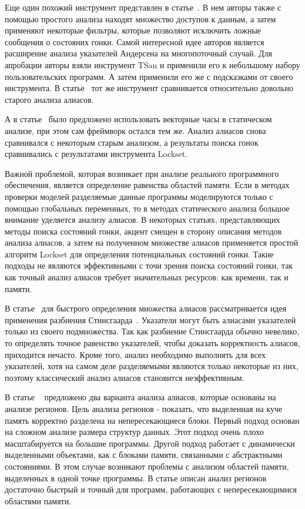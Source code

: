 Еще один похожий инструмент представлен в статье~\cite{Di:2016:ADD}.
В нем авторы также с помощью простого анализа находят множество доступов к данным, а затем применяют некоторые фильтры, которые позволяют исключить ложные сообщения о состояних гонки.
Самой интересной идее авторов является расширение анализа указателей Андерсена на многопоточный случай.
Для апробации авторы взяли инструмент TSan и применили его к небольшому набору пользовательских программ. 
А затем применили его же с подсказками от своего инструмента. 
В статье~\cite{Sui:2016} тот же инструмент сравнивается относительно довольно старого анализа алиасов.

А в статье~\cite{Zhou:2018} было предложено использовать векторные часы в статическом анализе, при этом сам фреймворк остался тем же.
Анализ алиасов снова сравнивался с некоторым старым анализом, а результаты поиска гонок сравнивались с результатами инструмента Lockset.


Важной проблемой, которая возникает при анализе реального программного обеспечения, является определение равенства областей памяти.
Если в методах проверки моделей разделяемые данные программы моделируются только с помощью глобальных переменных, то в методах статического анализа большое внимание уделяется анализу алиасов.
В некоторых статьях, представляющих методы поиска состояний гонки, акцент смещен в сторону описания методов анализа алиасов, а затем на полученном множестве алиасов применяется простой алгоритм Lockset для определения потенциальных состояний гонки. 
Такие подходы не являются эффективными с точи зрения поиска состояний гонки, так как точный анализ алиасов требует значительных ресурсов: как времени, так и памяти.

В статье~\cite{Kahlon:2009:SDR} для быстрого определения множества алиасов рассматривается идея применения разбиения Стинсгаарда~\cite{Steensgaard:1996}. 
Указатели могут быть алиасами указателей только из своего подмножества.
Так как разбиение Стинсгаарда обычно невелико, то определять точное равенство указателей, чтобы доказать корректность алиасов, приходится нечасто.
Кроме того, анализ необходимо выполнять для всех указателей, хотя на самом деле разделяемыми являются только некоторые из них, поэтому классический анализ алиасов становится неэффективным.

В статье ~\cite{Seidl:2009} предложено два варианта анализа алиасов, которые основаны на анализе регионов.
Цель анализа регионов - показать, что выделенная на куче память корректно разделена на непересекающиеся блоки.
Первый подход основан на сложном анализе размера структур данных. Этот подход очень плохо масштабируется на большие программы.
Другой подход работает с динамически выделенными объектами, как с блоками памяти, связанными с абстрактными состояниями.
В этом случае возникают проблемы с анализом областей памяти, выделенных в одной точке программы.
В статье описан анализ регионов достаточно быстрый и точный для программ, работающих с непересекающимися областями памяти.

